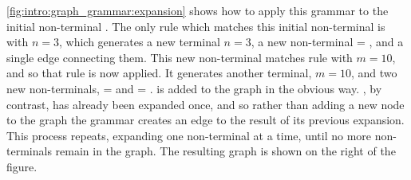 \autoref{fig:intro:graph_grammar:expansion} shows how to apply this
grammar to the initial non-terminal .  The only rule which
matches this initial non-terminal is  with $n=3$, which
generates a new terminal $n = 3$, a new non-terminal 
= , and a single edge connecting them.  This new
non-terminal matches rule  with $m = 10$, and so that rule
is now applied.  It generates another terminal, $m = 10$, and two new
non-terminals,  =  and
 = .   is added to the
graph in the obvious way.  , by contrast, has already been
expanded once, and so rather than adding a new node to the graph the
grammar creates an edge to the result of its previous expansion.  This
process repeats, expanding one non-terminal at a time, until no more
non-terminals remain in the graph.  The resulting graph is shown on
the right of the figure.

